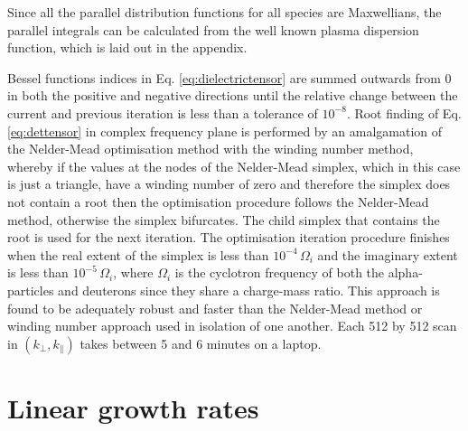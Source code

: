 \documentclass[12pt]{iopart}
\begin{document}
Since all the parallel distribution functions for all species are Maxwellians,
the parallel integrals can be calculated from the well known plasma dispersion
function\cite{Fried1961}, which is laid out in the appendix.

Bessel functions indices in Eq. \ref{eq:dielectrictensor} are summed outwards
from 0 in both the positive and negative directions
until the relative change between the current and
previous iteration is less than a tolerance of $10^{-8}$. Root finding of Eq.
\ref{eq:dettensor} in complex frequency plane is performed by an amalgamation of the
Nelder-Mead\cite{Nelder1965} optimisation method with the winding number method,
whereby if the values at the nodes of the Nelder-Mead simplex, which in this
case is just a triangle, have a winding number
of zero and therefore the simplex does not contain a root then the optimisation
procedure follows the Nelder-Mead method, otherwise the simplex bifurcates.
The child simplex that contains the root is used for the next
iteration. The optimisation iteration procedure finishes when the real extent of
the simplex is less than $10^{-4}\, \Omega_i$ and the imaginary extent is less
than $10^{-5}\,\Omega_i$, where $\Omega_i$ is the cyclotron frequency of both
the alpha-particles and deuterons since they share a charge-mass ratio.
This approach is found to be adequately robust and
faster than the Nelder-Mead method or winding number approach used in isolation
of one another. Each 512 by 512 scan in $(k_\perp, k_\parallel)$ takes between 5
and 6 minutes on a laptop.

\section{Linear growth rates}
\end{document}

